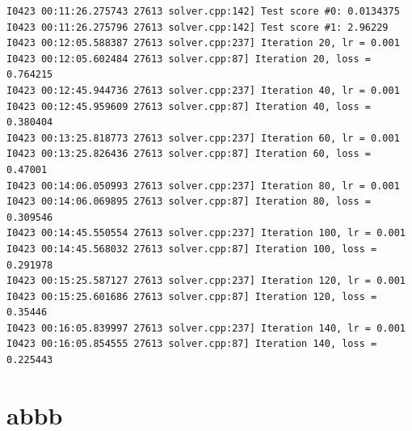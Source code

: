 \documentclass[a4]{article}
\begin{document}
\begin{lstlisting}
I0423 00:11:26.275743 27613 solver.cpp:142] Test score #0: 0.0134375
I0423 00:11:26.275796 27613 solver.cpp:142] Test score #1: 2.96229
I0423 00:12:05.588387 27613 solver.cpp:237] Iteration 20, lr = 0.001
I0423 00:12:05.602484 27613 solver.cpp:87] Iteration 20, loss = 0.764215
I0423 00:12:45.944736 27613 solver.cpp:237] Iteration 40, lr = 0.001
I0423 00:12:45.959609 27613 solver.cpp:87] Iteration 40, loss = 0.380404
I0423 00:13:25.818773 27613 solver.cpp:237] Iteration 60, lr = 0.001
I0423 00:13:25.826436 27613 solver.cpp:87] Iteration 60, loss = 0.47001
I0423 00:14:06.050993 27613 solver.cpp:237] Iteration 80, lr = 0.001
I0423 00:14:06.069895 27613 solver.cpp:87] Iteration 80, loss = 0.309546
I0423 00:14:45.550554 27613 solver.cpp:237] Iteration 100, lr = 0.001
I0423 00:14:45.568032 27613 solver.cpp:87] Iteration 100, loss = 0.291978
I0423 00:15:25.587127 27613 solver.cpp:237] Iteration 120, lr = 0.001
I0423 00:15:25.601686 27613 solver.cpp:87] Iteration 120, loss = 0.35446
I0423 00:16:05.839997 27613 solver.cpp:237] Iteration 140, lr = 0.001
I0423 00:16:05.854555 27613 solver.cpp:87] Iteration 140, loss = 0.225443

\end{lstlisting}

\section{abbb}
\end{document}
